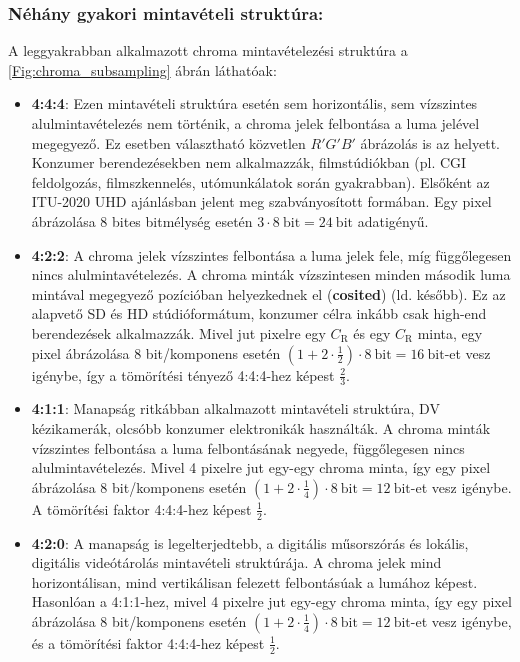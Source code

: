 \subsubsection*{Néhány gyakori mintavételi struktúra:\\}

A leggyakrabban alkalmazott chroma mintavételezési struktúra a \ref{Fig:chroma_subsampling} ábrán láthatóak:
\begin{itemize}
\item \textbf{4:4:4}: Ezen mintavételi struktúra esetén sem horizontális, sem vízszintes alulmintavételezés nem történik, a chroma jelek felbontása a luma jelével megegyező.
Ez esetben választható közvetlen $R'G'B'$ ábrázolás is az \ycbcr helyett.
Konzumer berendezésekben nem alkalmazzák, filmstúdiókban (pl. CGI feldolgozás, filmszkennelés, utómunkálatok során gyakrabban).
Elsőként az ITU-2020 UHD ajánlásban jelent meg szabványosított formában.
Egy pixel ábrázolása 8 bites bitmélység esetén $3 \cdot 8 ~\mathrm{bit} = 24~\mathrm{bit}$ adatigényű.
%
\item \textbf{4:2:2}: A chroma jelek vízszintes felbontása a luma jelek fele, míg függőlegesen nincs alulmintavételezés.
A chroma minták vízszintesen minden második luma mintával megegyező pozícióban helyezkednek el (\textbf{cosited}) (ld. később).
Ez az alapvető SD és HD stúdióformátum, konzumer célra inkább csak high-end berendezések alkalmazzák.
Mivel jut pixelre egy $C_{\mathrm{R}}$ és egy $C_{\mathrm{R}}$ minta, egy pixel ábrázolása 8 bit/komponens esetén $(1+ 2\cdot \frac{1}{2})\cdot 8~\mathrm{bit} = 16~\mathrm{bit}$-et vesz igénybe, így a tömörítési tényező 4:4:4-hez képest $\frac{2}{3}$.
%
\item \textbf{4:1:1}: Manapság ritkábban alkalmazott mintavételi struktúra, DV kézikamerák, olcsóbb konzumer elektronikák használták.
A chroma minták vízszintes felbontása a luma felbontásának negyede, függőlegesen nincs alulmintavételezés.
Mivel 4 pixelre jut egy-egy chroma minta, így egy pixel ábrázolása 8 bit/komponens esetén $(1+ 2\cdot \frac{1}{4})\cdot 8~\mathrm{bit} = 12~\mathrm{bit}$-et vesz igénybe. 
A tömörítési faktor 4:4:4-hez képest $\frac{1}{2}$.
%
\item \textbf{4:2:0}: A manapság is legelterjedtebb, a digitális műsorszórás és lokális, digitális videótárolás mintavételi struktúrája.
A chroma jelek mind horizontálisan, mind vertikálisan felezett felbontásúak a lumához képest.
Hasonlóan a 4:1:1-hez, mivel 4 pixelre jut egy-egy chroma minta, így egy pixel ábrázolása 8 bit/komponens esetén $(1+ 2\cdot \frac{1}{4})\cdot 8~\mathrm{bit} = 12~\mathrm{bit}$-et vesz igénybe, és a tömörítési faktor 4:4:4-hez képest $\frac{1}{2}$.


\end{itemize}

